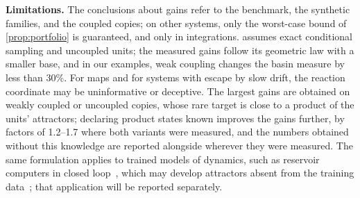 \textbf{Limitations.} The conclusions about gains refer to the benchmark, the synthetic families, and the coupled copies; on other systems, only the worst-case bound of \cref{prop:portfolio} is guaranteed, and only in integrations.  assumes exact conditional sampling and uncoupled units; the measured gains follow its geometric law with a smaller base, and in our examples, weak coupling changes the basin measure by less than 30\%. For maps and for systems with escape by slow drift, the reaction coordinate may be uninformative or deceptive. The largest gains are obtained on weakly coupled or uncoupled copies, whose rare target is close to a product of the units' attractors; declaring product states known improves the gains further, by factors of 1.2--1.7 where both variants were measured, and the numbers obtained without this knowledge are reported alongside wherever they were measured. The same formulation applies to trained models of dynamics, such as reservoir computers in closed loop~\cite{Pathak2017Chaos,LuHuntOtt2018}, which may develop attractors absent from the training data~\cite{HaluszczynskiRath2019,HerteuxRath2020,Flynn2021,Kabayama2025PseudoLorenz}; that application will be reported separately.

